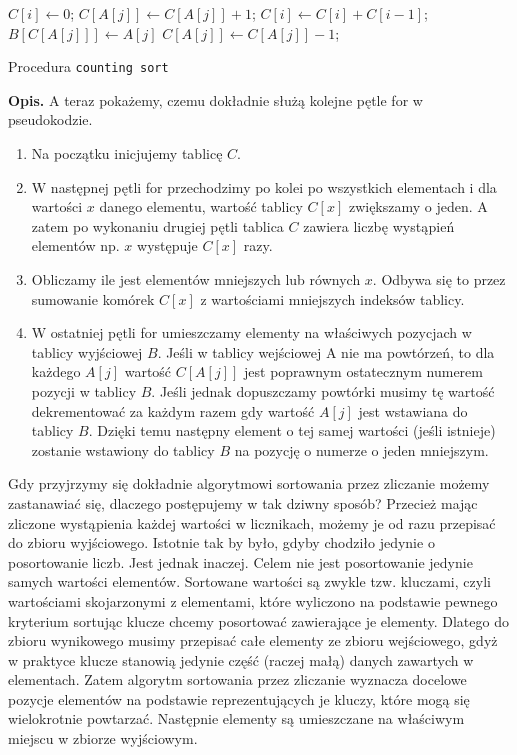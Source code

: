 \begin{algorithm}[h]

  \DontPrintSemicolon
  
  

  
     {
    $C[i] \leftarrow 0$;
  }
      {
    $C[A[j]] \leftarrow C[A[j]]+1$;
  }
      {
    $C[i] \leftarrow C[i]+C[i-1]$;
  }
      {
    $B[C[A[j]]] \leftarrow A[j]$\;
    $C[A[j]] \leftarrow C[A[j]]-1$;
  }
  
  \caption{Procedura \texttt{counting sort}}
  \label{alg-count}
\end{algorithm}
\textbf{Opis.}
A teraz pokażemy, czemu dokładnie służą kolejne pętle for w pseudokodzie.
\begin{enumerate}
\item Na początku inicjujemy tablicę $C$.
\item W następnej pętli for przechodzimy po kolei po wszystkich elementach i dla wartości $x$ danego elementu, wartość tablicy $C[x]$ zwiększamy o jeden.
      A zatem po wykonaniu drugiej pętli tablica $C$ zawiera liczbę wystąpień elementów np. $x$ występuje $C[x]$ razy.
\item Obliczamy ile jest elementów mniejszych lub równych $x$. Odbywa się to przez sumowanie komórek $C[x]$ z wartościami mniejszych indeksów tablicy.
\item W ostatniej pętli for umieszczamy elementy na właściwych pozycjach w tablicy wyjściowej $B$.
      Jeśli w tablicy wejściowej A nie ma powtórzeń, to dla każdego $A[j]$ wartość $C[A[j]]$ jest poprawnym ostatecznym numerem pozycji w tablicy $B$.
      Jeśli jednak dopuszczamy powtórki musimy tę wartość dekrementować za każdym razem gdy wartość $A[j]$ jest wstawiana do tablicy $B$.
      Dzięki temu następny element o tej samej wartości (jeśli istnieje) zostanie wstawiony do tablicy $B$ na pozycję o numerze o jeden mniejszym.
\end{enumerate}

Gdy przyjrzymy się dokładnie algorytmowi sortowania przez zliczanie możemy zastanawiać się, dlaczego postępujemy w tak dziwny sposób?
Przecież mając zliczone wystąpienia każdej wartości w licznikach, możemy je od razu przepisać do zbioru wyjściowego.
Istotnie tak by było, gdyby chodziło jedynie o posortowanie liczb. Jest jednak inaczej.
Celem nie jest posortowanie jedynie samych wartości elementów.
Sortowane wartości są zwykle tzw. kluczami, czyli wartościami skojarzonymi z elementami, które wyliczono na podstawie pewnego kryterium sortując klucze chcemy posortować zawierające je elementy.
Dlatego do zbioru wynikowego musimy przepisać całe elementy ze zbioru wejściowego, gdyż w praktyce klucze stanowią jedynie część (raczej małą) danych zawartych w elementach.
Zatem algorytm sortowania przez zliczanie wyznacza docelowe pozycje elementów na podstawie reprezentujących je kluczy, które mogą się wielokrotnie powtarzać.
Następnie elementy są umieszczane na właściwym miejscu w zbiorze wyjściowym.

